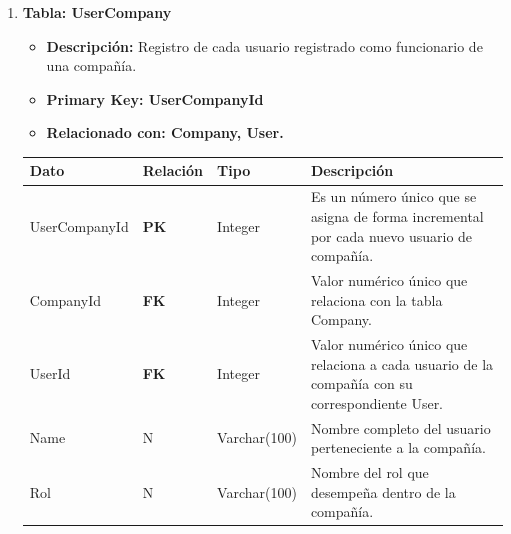 \documentclass[12pt]{article}
\begin{document}
\begin{enumerate}
    \item \textbf{Tabla: UserCompany}
    \begin{itemize}
        \item \textbf{Descripción:} Registro de cada usuario registrado como funcionario de una compañía.
        \item \textbf{Primary Key: UserCompanyId}
        \item \textbf{Relacionado con: Company, User.}
    \end{itemize}
    \begin{table}[!h]
        \centering
        \begin{tabular}{|p{3cm}|p{2cm}|p{2.5cm}|p{8cm}|}
             \hline
             \textbf{Dato} & \textbf{Relación} & \textbf{Tipo} & \textbf{Descripción} \\
             \hline
             UserCompanyId & \textbf{PK} & Integer & Es un número único que se asigna de forma incremental por cada nuevo usuario de compañía. \\
             \hline
             CompanyId & \textbf{FK} & Integer & Valor numérico único que relaciona con la tabla Company.\\
             \hline
             UserId & \textbf{FK} & Integer & Valor numérico único que relaciona a cada usuario de la compañía con su correspondiente User. \\
             \hline
             Name & N & Varchar(100) & Nombre completo del usuario perteneciente a la compañía. \\
             \hline
             Rol & N & Varchar(100) & Nombre del rol que desempeña dentro de la compañía. \\
             \hline
        \end{tabular}
    \end{table}


\end{enumerate}
\end{document}

